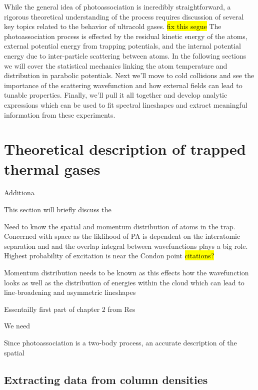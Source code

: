 While the general idea of photoassociation is incredibly straightforward, a rigorous theoretical understanding of the process requires discussion of several key topics related to the behavior of ultracold gases. \hl{fix this segue}
The photoassociation process is effected by the residual kinetic energy of the atoms, external potential energy from trapping potentials, and the internal potential energy due to inter-particle scattering between atoms.
In the following sections we will cover the statistical mechanics linking the atom temperature and distribution in parabolic potentials.
Next we'll move to cold collisions and see the importance of the scattering wavefunction and how external fields can lead to tunable properties.
Finally, we'll pull it all together and develop analytic expressions which can be used to fit spectral lineshapes and extract meaningful information from these experiments.

\section{Theoretical description of trapped thermal gases} \label{sec:trapped_gases}

Additiona

This section will briefly discuss the 

Need to know the spatial and momentum distribution of atoms in the trap. Concerned with space as the liklihood of PA is dependent on the interatomic separation and and the overlap integral between wavefunctions plays a big role. Highest probability of excitation is near the Condon point \hl{citations?}

Momentum distribution needs to be known as this effects how the wavefunction looks as well as the distribution of energies within the cloud which can lead to line-broadening and asymmetric lineshapes

Essentailly first part of chapter 2 from Res

We need 

Since photoassociation is a two-body process, an accurate description of the spatial

\subsection{Extracting data from column densities} \label{ssec:tof}

